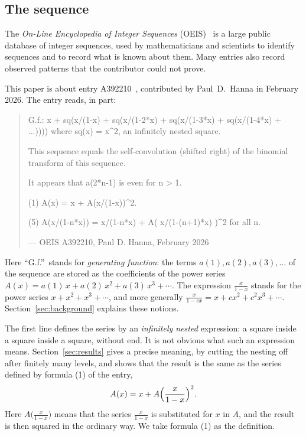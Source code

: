 \documentclass[11pt,a4paper]{article}
\theoremstyle{definition}
\theoremstyle{remark}
\begin{document}
\subsection{The sequence}\label{sec:sequence}
The \emph{On-Line Encyclopedia of Integer Sequences} (OEIS)~\cite{oeisdb} is a large public database of integer
sequences, used by mathematicians and scientists to identify sequences and to record what is known about them. Many
entries also record observed patterns that the contributor could not prove.

This paper is about entry A392210~\cite{oeis}, contributed by Paul~D.~Hanna in February 2026. The entry reads, in part:
\begin{quote}\small\ttfamily\raggedright G.f.: x + sq(x/(1-x) + sq(x/(1-2*x) + sq(x/(1-3*x) + sq(x/(1-4*x) + ...)))) where sq(x) = x\^{}2, an infinitely nested square.\par\smallskip This sequence equals the self-convolution (shifted right) of the binomial transform of this sequence.\par\smallskip It appears that a(2*n-1) is even for n > 1.\par\smallskip (1) A(x) = x + A(x/(1-x))\^{}2.\par\smallskip (5) A(x/(1-n*x)) = x/(1-n*x) + A( x/(1-(n+1)*x) )\^{}2 for all n.\par\smallskip\hfill\textrm{--- OEIS A392210, Paul D. Hanna, February 2026}\end{quote}

Here ``G.f.''\ stands for \emph{generating function}: the terms $a(1),a(2),a(3),\dots$ of the sequence are stored as the
coefficients of the power series $A(x)=a(1)\,x+a(2)\,x^2+a(3)\,x^3+\cdots$. The expression $\frac{x}{1-x}$ stands for
the power series $x+x^2+x^3+\cdots$, and more generally $\frac{x}{1-cx}=x+cx^2+c^2x^3+\cdots$.
Section~\ref{sec:background} explains these notions.

The first line defines the series by an \emph{infinitely nested} expression: a square inside a square inside a square,
without end. It is not obvious what such an expression means. Section~\ref{sec:results} gives a precise meaning, by
cutting the nesting off after finitely many levels, and shows that the result is the same as the series defined by
formula (1) of the entry,
\[
A(x)=x+A\Bigl(\frac{x}{1-x}\Bigr)^2 .
\]
Here $A\bigl(\frac{x}{1-x}\bigr)$ means that the series $\frac{x}{1-x}$ is substituted for $x$ in $A$, and the result is
then squared in the ordinary way. We take formula (1) as the definition.
\end{document}
